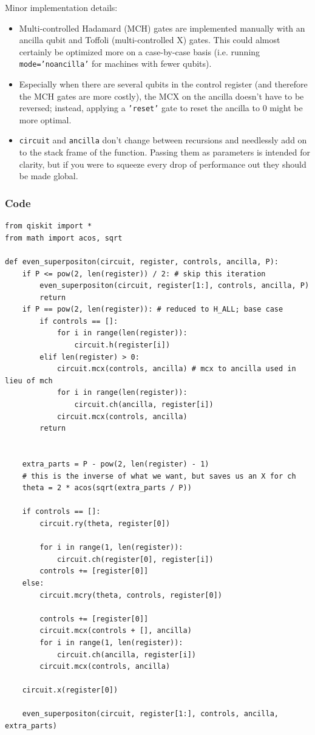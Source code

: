 \documentclass[12pt]{article}
\begin{document}
\vspace{10mm}
\noindent Minor implementation details:
\begin{itemize}
    \item Multi-controlled Hadamard (MCH) gates are implemented manually with an ancilla qubit and Toffoli (multi-controlled X) gates. This could almost certainly be optimized more on a case-by-case basis (i.e. running \texttt{mode='noancilla'} for machines with fewer qubits).
    \item Especially when there are several qubits in the control register (and therefore the MCH gates are more costly), the MCX on the ancilla doesn't have to be reversed; instead, applying a  \texttt{'reset'} gate to reset the ancilla to 0 might be more optimal.
    \item \texttt{circuit} and \texttt{ancilla} don't change between recursions and needlessly add on to the stack frame of the function. Passing them as parameters is intended for clarity, but if you were to squeeze every drop of performance out they should be made global.
\end{itemize}
\subsubsection{Code}
\begin{verbatim}
from qiskit import *
from math import acos, sqrt

def even_superpositon(circuit, register, controls, ancilla, P):
    if P <= pow(2, len(register)) / 2: # skip this iteration
        even_superpositon(circuit, register[1:], controls, ancilla, P)
        return
    if P == pow(2, len(register)): # reduced to H_ALL; base case
        if controls == []:
            for i in range(len(register)):
                circuit.h(register[i])
        elif len(register) > 0:
            circuit.mcx(controls, ancilla) # mcx to ancilla used in lieu of mch
            for i in range(len(register)):
                circuit.ch(ancilla, register[i])
            circuit.mcx(controls, ancilla)
        return


    extra_parts = P - pow(2, len(register) - 1)
    # this is the inverse of what we want, but saves us an X for ch
    theta = 2 * acos(sqrt(extra_parts / P))

    if controls == []:
        circuit.ry(theta, register[0])

        for i in range(1, len(register)):
            circuit.ch(register[0], register[i])
        controls += [register[0]]
    else:
        circuit.mcry(theta, controls, register[0])

        controls += [register[0]]
        circuit.mcx(controls + [], ancilla)
        for i in range(1, len(register)):
            circuit.ch(ancilla, register[i])
        circuit.mcx(controls, ancilla)

    circuit.x(register[0])

    even_superpositon(circuit, register[1:], controls, ancilla, extra_parts)
\end{verbatim}
\label{qrng}
\end{document}
